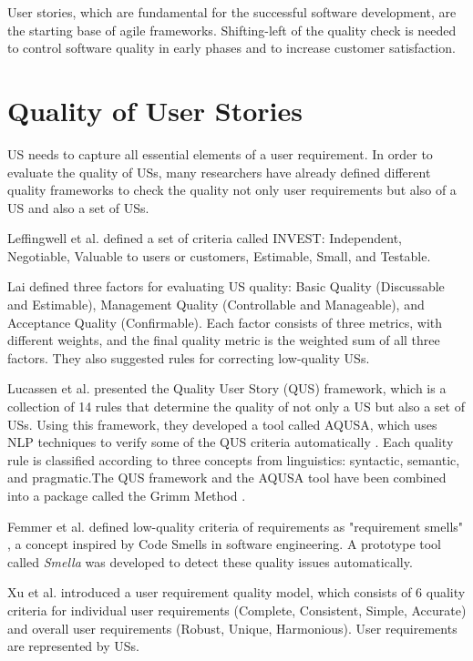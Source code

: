 \documentclass[a4paper, 11 pt, leqno, titlepage = true, toc=bib, oneside]{scrbook}
\begin{document}
User stories, which are fundamental for the successful software development, are the starting base of agile frameworks\cite{1}. Shifting-left of the quality check is needed to control software quality in early phases and to increase customer satisfaction.

\section{Quality of User Stories}
US needs to capture all essential elements of a user requirement. In order to evaluate the quality of USs, many researchers have already defined different quality frameworks to check the quality not only user requirements but also of a US and also a set of USs.

Leffingwell et al. defined a set of criteria called INVEST: Independent, Negotiable, Valuable to users or customers, Estimable, Small, and Testable.\cite{Leffingwell2009}

Lai defined three factors for evaluating US quality: Basic Quality (Discussable and Estimable), Management Quality (Controllable and Manageable), and Acceptance Quality (Confirmable). Each factor consists of three metrics, with different weights, and the final quality metric is the weighted sum of all three factors. They also suggested rules for correcting low-quality USs.\cite{Lai2017}

Lucassen et al. presented the Quality User Story (QUS) framework, which is a collection of 14 rules that determine the quality of not only a US but also a set of USs. Using this framework, they developed a tool called AQUSA, which uses NLP techniques to verify some of the QUS criteria automatically \cite{LucassenFramework}. Each quality rule is classified according to three concepts from linguistics: syntactic, semantic, and pragmatic.The QUS framework and the AQUSA tool have been combined into a package called the Grimm Method \cite{LucassenGrimMethod}.

Femmer et al. defined low-quality criteria of requirements as "requirement smells" \cite{Femmer2017}, a concept inspired by Code Smells in software engineering. A prototype tool called \textit{Smella} was developed to detect these quality issues automatically.

Xu et al. \cite{Xu2023} introduced a user requirement quality model, which consists of 6 quality criteria for individual user requirements (Complete, Consistent, Simple, Accurate) and overall user requirements (Robust, Unique, Harmonious). User requirements are represented by USs.
\end{document}
